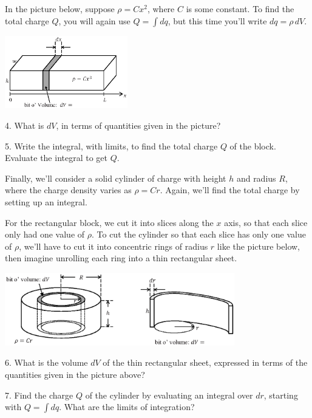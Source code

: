 \newpage

In the picture below, suppose $\rho = Cx^2$, where $C$ is some constant. To find the total charge $Q$, you will again use $Q = \int dq$, but this time you'll write $dq = \rho \,dV$.  
\vspace{-0.2 in}
\begin{center}
\includegraphics[width=0.40\textwidth]{charge_density/fig4.eps}
\end{center}

4.  What is $dV$, in terms of quantities given in the picture?
\vspace{0.3in}

5.  Write the integral, with limits, to find the total charge $Q$ of the block.  Evaluate the integral to get $Q$.
\vspace{1.0in}

Finally, we'll consider a solid cylinder of charge with height $h$ and radius $R$, where the charge density varies as $\rho = Cr$.  Again, we'll find the total charge by setting up an integral. 

For the rectangular block, we cut it into slices along the $x$ axis, so that each slice only had one value of $\rho$.  To cut the cylinder so that each slice has only one value of $\rho$, we'll have to cut it into concentric rings of radius $r$ like the picture below, then imagine unrolling each ring into a thin rectangular sheet.

\begin{center}
\includegraphics[width=0.75\textwidth]{charge_density/cylinders.eps}
\end{center}

6. What is the volume $dV$ of the thin rectangular sheet, expressed in terms of the quantities given in the picture above?
\vspace{0.3in}

7. Find the charge $Q$ of the cylinder by evaluating an integral over $dr$, starting with $Q = \int dq$.  What are the limits of integration? 



